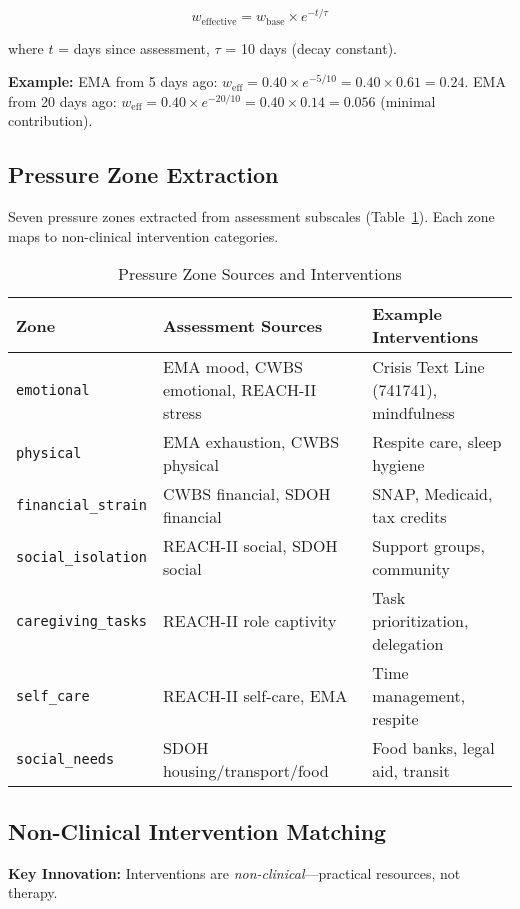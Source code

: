 \documentclass{article}
\begin{document}
$$w_{\text{effective}} = w_{\text{base}} \times e^{-t / \tau}$$

where $t$ = days since assessment, $\tau$ = 10 days (decay constant).

\textbf{Example:} EMA from 5 days ago: $w_{\text{eff}} = 0.40 \times e^{-5/10} = 0.40 \times 0.61 = 0.24$. EMA from 20 days ago: $w_{\text{eff}} = 0.40 \times e^{-20/10} = 0.40 \times 0.14 = 0.056$ (minimal contribution).

%
\subsection{Pressure Zone Extraction}%
\label{subsec:PressureZoneExtraction}%
Seven pressure zones extracted from assessment subscales (Table~\ref{table:pressure_zones}). Each zone maps to non-clinical intervention categories.

\begin{table}[h]
\centering
\caption{Pressure Zone Sources and Interventions}
\label{table:pressure_zones}
\small
\begin{tabular}{lp{4cm}p{5cm}}
\toprule
\textbf{Zone} & \textbf{Assessment Sources} & \textbf{Example Interventions} \\
\midrule
\texttt{emotional} & EMA mood, CWBS emotional, REACH-II stress & Crisis Text Line (741741), mindfulness \\
\texttt{physical} & EMA exhaustion, CWBS physical & Respite care, sleep hygiene \\
\texttt{financial\_strain} & CWBS financial, SDOH financial & SNAP, Medicaid, tax credits \\
\texttt{social\_isolation} & REACH-II social, SDOH social & Support groups, community \\
\texttt{caregiving\_tasks} & REACH-II role captivity & Task prioritization, delegation \\
\texttt{self\_care} & REACH-II self-care, EMA & Time management, respite \\
\texttt{social\_needs} & SDOH housing/transport/food & Food banks, legal aid, transit \\
\bottomrule
\end{tabular}
\end{table}

%
\subsection{Non{-}Clinical Intervention Matching}%
\label{subsec:Non{-}ClinicalInterventionMatching}%
\textbf{Key Innovation:} Interventions are \textit{non-clinical}—practical resources, not therapy.
\end{document}
